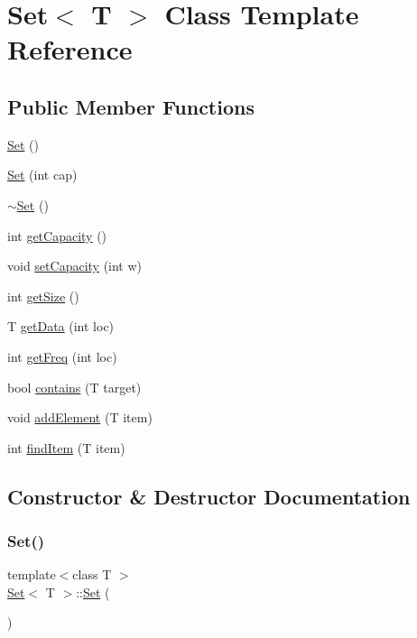 \hypertarget{class_set}{}\section{Set$<$ T $>$ Class Template Reference}
\label{class_set}
\subsection*{Public Member Functions}
\begin{DoxyCompactItemize}
\item 
\hyperlink{class_set_ac57fb2ceddf11dad44bcd9329265580d}{Set} ()
\item 
\hyperlink{class_set_a97a93684c0b9e5a9921c58ce30aded1c}{Set} (int cap)
\item 
\hyperlink{class_set_aaa4abcf9b94524173e55b7301c7009f4}{$\sim$\+Set} ()
\item 
int \hyperlink{class_set_a242561b28705ae5b17e1b4e46e893af4}{get\+Capacity} ()
\item 
void \hyperlink{class_set_a94e652a0e9f9922c79762adb6eaf86c1}{set\+Capacity} (int w)
\item 
int \hyperlink{class_set_a3d2e0df73e2455964840fe5c668f3d81}{get\+Size} ()
\item 
T \hyperlink{class_set_a4989b0d383c94f67e33641b8b54ad7eb}{get\+Data} (int loc)
\item 
int \hyperlink{class_set_a06e2cc25660f6a4ff0d9b7af372f2a5e}{get\+Freq} (int loc)
\item 
bool \hyperlink{class_set_ae87a06144566865cc26a21e2ad96d214}{contains} (T target)
\item 
void \hyperlink{class_set_ac96d9574533e25b2689bae916badfcd8}{add\+Element} (T item)
\item 
int \hyperlink{class_set_a573c96681af42c868e736f1c503a2443}{find\+Item} (T item)
\end{DoxyCompactItemize}


\subsection{Constructor \& Destructor Documentation}
\mbox{\label{class_set_ac57fb2ceddf11dad44bcd9329265580d}} 
\subsubsection{\texorpdfstring{Set()}{Set()}\hspace{0.1cm}{\footnotesize\ttfamily [1/2]}}
{\footnotesize\ttfamily template$<$class T $>$ \\
\hyperlink{class_set}{Set}$<$ T $>$\+::\hyperlink{class_set}{Set} (\begin{DoxyParamCaption}{ }\end{DoxyParamCaption})}

